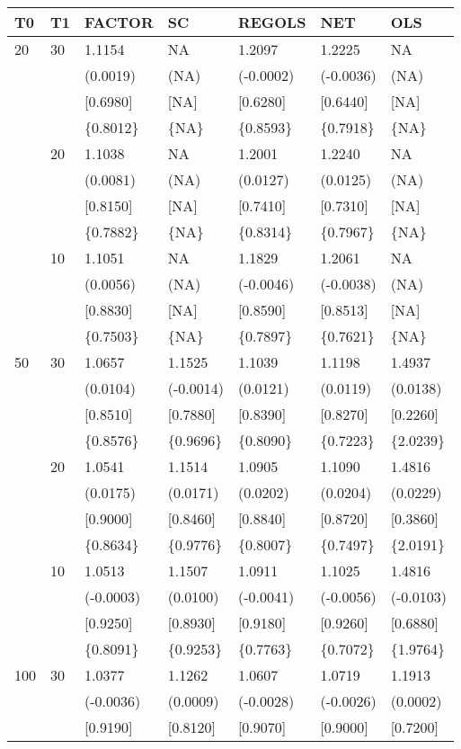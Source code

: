 \begin{table}[ht]
\centering
\begin{tabular}{lllllll}
\hline
T0&T1&FACTOR&SC&REGOLS&NET&OLS\\
\hline
20&30&1.1154&NA&1.2097&1.2225&NA\\
&&(0.0019)&(NA)&(-0.0002)&(-0.0036)&(NA)\\
&&[0.6980]&[NA]&[0.6280]&[0.6440]&[NA]\\
&&\{0.8012\}&\{NA\}&\{0.8593\}&\{0.7918\}&\{NA\}\\
&20&1.1038&NA&1.2001&1.2240&NA\\
&&(0.0081)&(NA)&(0.0127)&(0.0125)&(NA)\\
&&[0.8150]&[NA]&[0.7410]&[0.7310]&[NA]\\
&&\{0.7882\}&\{NA\}&\{0.8314\}&\{0.7967\}&\{NA\}\\
&10&1.1051&NA&1.1829&1.2061&NA\\
&&(0.0056)&(NA)&(-0.0046)&(-0.0038)&(NA)\\
&&[0.8830]&[NA]&[0.8590]&[0.8513]&[NA]\\
&&\{0.7503\}&\{NA\}&\{0.7897\}&\{0.7621\}&\{NA\}\\
50&30&1.0657&1.1525&1.1039&1.1198&1.4937\\
&&(0.0104)&(-0.0014)&(0.0121)&(0.0119)&(0.0138)\\
&&[0.8510]&[0.7880]&[0.8390]&[0.8270]&[0.2260]\\
&&\{0.8576\}&\{0.9696\}&\{0.8090\}&\{0.7223\}&\{2.0239\}\\
&20&1.0541&1.1514&1.0905&1.1090&1.4816\\
&&(0.0175)&(0.0171)&(0.0202)&(0.0204)&(0.0229)\\
&&[0.9000]&[0.8460]&[0.8840]&[0.8720]&[0.3860]\\
&&\{0.8634\}&\{0.9776\}&\{0.8007\}&\{0.7497\}&\{2.0191\}\\
&10&1.0513&1.1507&1.0911&1.1025&1.4816\\
&&(-0.0003)&(0.0100)&(-0.0041)&(-0.0056)&(-0.0103)\\
&&[0.9250]&[0.8930]&[0.9180]&[0.9260]&[0.6880]\\
&&\{0.8091\}&\{0.9253\}&\{0.7763\}&\{0.7072\}&\{1.9764\}\\
100&30&1.0377&1.1262&1.0607&1.0719&1.1913\\
&&(-0.0036)&(0.0009)&(-0.0028)&(-0.0026)&(0.0002)\\
&&[0.9190]&[0.8120]&[0.9070]&[0.9000]&[0.7200]\\

\end{tabular}
\end{table}
